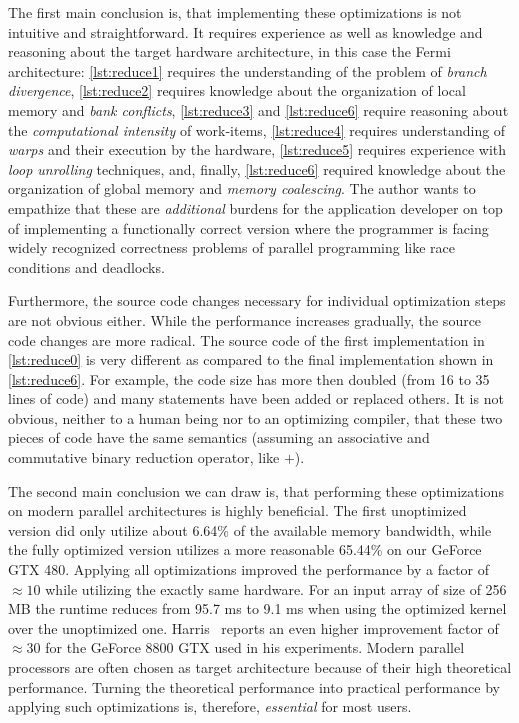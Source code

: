 The first main conclusion is, that implementing these optimizations is not intuitive and straightforward.
It requires experience as well as knowledge and reasoning about the target hardware architecture, in this case the Fermi \GPU architecture:
\autoref{lst:reduce1} requires the understanding of the problem of \emph{branch divergence}, \autoref{lst:reduce2} requires knowledge about the organization of local memory and \emph{bank conflicts}, \autoref{lst:reduce3} and \autoref{lst:reduce6} require reasoning about the \emph{computational intensity} of work-items, \autoref{lst:reduce4} requires understanding of \emph{warps} and their execution by the hardware, \autoref{lst:reduce5} requires experience with \emph{loop unrolling} techniques, and, finally, \autoref{lst:reduce6} required knowledge about the organization of global memory and \emph{memory coalescing}.
The author wants to empathize that these are \emph{additional} burdens for the application developer on top of implementing a functionally correct version where the programmer is facing widely recognized correctness problems of parallel programming like race conditions and deadlocks.

Furthermore, the source code changes necessary for individual optimization steps are not obvious either.
While the performance increases gradually, the source code changes are more radical.
The source code of the first implementation in \autoref{lst:reduce0} is very different as compared to the final implementation shown in \autoref{lst:reduce6}.
For example, the code size has more then doubled (from 16 to 35 lines of code) and many statements have been added or replaced others.
It is not obvious, neither to a human being nor to an optimizing compiler, that these two pieces of code have the same semantics (assuming an associative and commutative binary reduction operator, like $+$).

The second main conclusion we can draw is, that performing these optimizations on modern parallel architectures is highly beneficial.
The first unoptimized version did only utilize about 6.64\% of the available memory bandwidth, while the fully optimized version utilizes a more reasonable 65.44\% on our GeForce GTX 480.
Applying all optimizations improved the performance by a factor of $\approx${}$10$ while utilizing the exactly same hardware.
For an input array of size of 256 MB the runtime reduces from 95.7 ms to 9.1 ms when using the optimized kernel over the unoptimized one.
Harris~\cite{Harris2007} reports an even higher improvement factor of $\approx${}$30$ for the GeForce 8800 GTX used in his experiments.
Modern parallel processors are often chosen as target architecture because of their high theoretical performance.
Turning the theoretical performance into practical performance by applying such optimizations is, therefore, \emph{essential} for most users.





